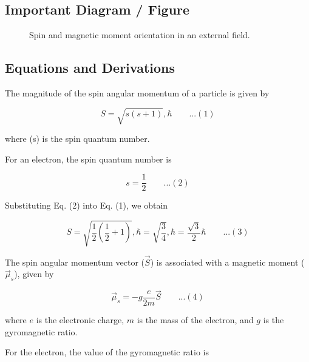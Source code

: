 \documentclass[12pt]{report}
\begin{document}
\subsection*{Important Diagram / Figure}
\begin{figure}[H]
    \centering
    \caption{Spin and magnetic moment orientation in an external field.}
\end{figure}

\subsection*{Equations and Derivations}

The magnitude of the spin angular momentum of a particle is given by

\begin{equation*}
S = \sqrt{s(s+1)},\hbar \qquad ...(1)
\end{equation*}

where (s) is the spin quantum number.

For an electron, the spin quantum number is

\begin{equation*}
s = \frac{1}{2} \qquad ...(2)
\end{equation*}

Substituting Eq. (2) into Eq. (1), we obtain

\begin{equation*}
S = \sqrt{\frac{1}{2}\left(\frac{1}{2}+1\right)},\hbar= \sqrt{\frac{3}{4}},\hbar= \frac{\sqrt{3}}{2}\hbar\qquad ...(3)
\end{equation*}

The spin angular momentum vector ($\vec{S}$) is associated with a magnetic moment ($\vec{\mu}_s$), given by

\begin{equation*}
\vec{\mu}_s = -g \frac{e}{2m} \vec{S}\qquad ...(4)
\end{equation*}

where $e$ is the electronic charge, $m$ is the mass of the electron, and $g$ is the gyromagnetic ratio.

For the electron, the value of the gyromagnetic ratio is
\end{document}
